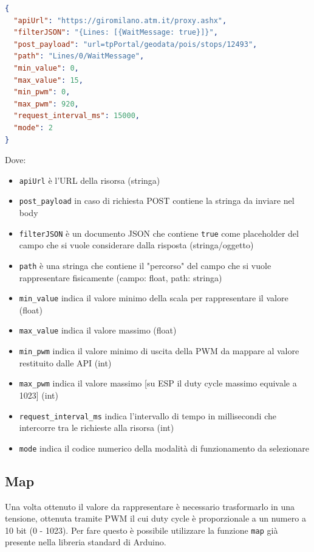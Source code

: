 \documentclass[12pt,a4paper]{report}
\begin{document}
\begin{lstlisting}[language=json,firstnumber=1]
{
  "apiUrl": "https://giromilano.atm.it/proxy.ashx",
  "filterJSON": "{Lines: [{WaitMessage: true}]}",
  "post_payload": "url=tpPortal/geodata/pois/stops/12493",
  "path": "Lines/0/WaitMessage",
  "min_value": 0,
  "max_value": 15,
  "min_pwm": 0,
  "max_pwm": 920,
  "request_interval_ms": 15000,
  "mode": 2
}
\end{lstlisting}


\noindent Dove:
\begin{itemize}
  \item \texttt{apiUrl} è l'URL della risorsa (stringa)
  \item \texttt{post_payload} in caso di richiesta POST contiene la stringa da inviare nel body
  \item \texttt{filterJSON} è un documento JSON che contiene \texttt{true} come placeholder del campo che si vuole considerare dalla risposta (stringa/oggetto)
  \item \texttt{path} è una stringa che contiene il "percorso" del campo che si vuole rappresentare fisicamente (campo: float, path: stringa)
  \item \texttt{min_value} indica il valore minimo della scala per rappresentare il valore (float)
  \item \texttt{max_value} indica il valore massimo (float)
  \item \texttt{min_pwm} indica il valore minimo di uscita della PWM da mappare al valore restituito dalle API (int)
  \item \texttt{max_pwm} indica il valore massimo [su ESP il duty cycle massimo equivale a 1023] (int)
  \item \texttt{request_interval_ms} indica l'intervallo di tempo in millisecondi che intercorre tra le richieste alla risorsa (int)
  \item \texttt{mode} indica il codice numerico della modalità di funzionamento da selezionare
\end{itemize}

\subsection{Map}
Una volta ottenuto il valore da rappresentare è necessario trasformarlo in una tensione, ottenuta tramite PWM il cui duty cycle è
proporzionale a un numero a 10 bit (0 - 1023). Per fare questo è possibile utilizzare la funzione \texttt{map} già presente nella
libreria standard di Arduino.
\end{document}
